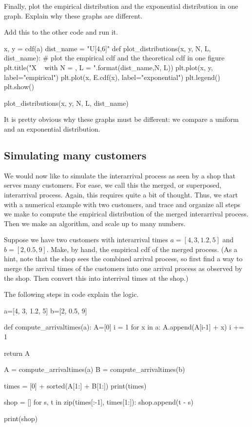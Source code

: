 \documentclass{scrartcl}
\begin{document}
\begin{exercise}
  Finally, plot the empirical distribution and the exponential distribution in one graph. Explain why these graphs are different.
\begin{solution}
Add this to the other code and run it. 
\begin{pyverbatim}
x, y = cdf(a)
dist_name = "U[4,6]"
def plot_distributions(x, y, N, L, dist_name):
    # plot the empirical cdf and the theoretical cdf in one figure
    plt.title("X ~ {} with N = {}, L = {}".format(dist_name,N, L))
    plt.plot(x, y, label="empirical")
    plt.plot(x, E.cdf(x), label="exponential")
    plt.legend()
    plt.show()

plot_distributions(x, y, N, L, dist_name)	
\end{pyverbatim}

It is pretty obvious why these graphs must be different: we compare a uniform and an exponential distribution. 
\end{solution}
\end{exercise}


\subsection{Simulating many customers}
\label{sec:simul-many-cust}

We would now like to simulate the interarrival process as seen by a shop that serves many customers. For ease, we call this the merged, or superposed, interarrival process. Again, this requires quite a bit of thought. Thus, we start with a numerical example with two customers, and trace and organize all steps we make to compute the empirical distribution of the merged interarrival process. Then we make an algorithm, and scale up to many numbers. 

\begin{exercise}
  Suppose we have two customers with interarrival times $a=[4, 3, 1.2, 5]$ and $b=[2, 0.5, 9]$. Make, by hand, the empirical cdf of the merged process.
(As a hint, note that the shop sees the combined arrival process, so first find a way to merge the arrival times of the customers into one arrival process as observed by the shop. Then convert this into interrival times at the shop.)
  \begin{solution}
    The following steps in code explain the logic.
    \begin{pyblock}
a=[4, 3, 1.2, 5]
b=[2, 0.5, 9]

def compute_arrivaltimes(a):
    A=[0]
    i = 1
    for x in a:
        A.append(A[i-1] + x)
        i += 1

    return A

A = compute_arrivaltimes(a)
B = compute_arrivaltimes(b)


times = [0] + sorted(A[1:] + B[1:]) 
print(times)

shop = []
for s, t in zip(times[:-1], times[1:]):
shop.append(t - s)

print(shop)
    \end{pyblock}
  \end{solution}
\end{exercise}
\end{document}
